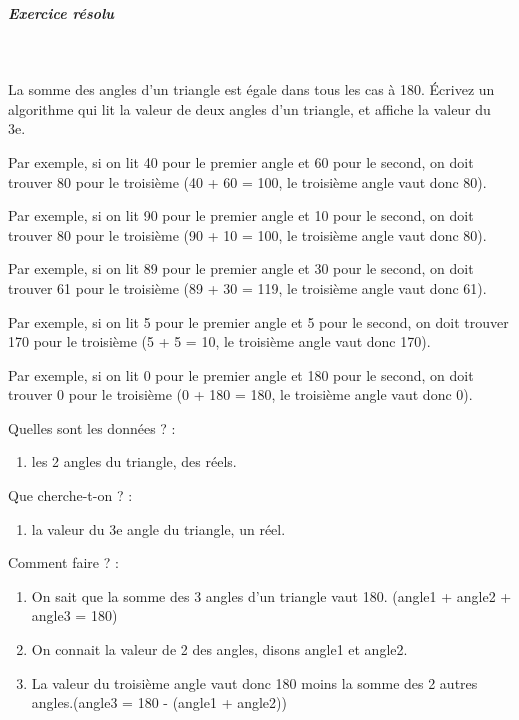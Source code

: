 \documentclass[11pt,a4paper]{article}
\begin{document}
			
		\subparagraph{Exercice r\'esolu} 
		
					\textcolor{white}{.} \par
				
          La somme des angles d'un triangle est \'egale dans tous les cas \`a 180\textdegree . \'Ecrivez un algorithme qui lit la valeur de deux angles d'un triangle, et affiche la valeur du 3e. 
        
            \par
        Par exemple, si on lit 40 pour le premier angle et 60 pour le second, on doit trouver 80 pour le troisi\`eme (40 + 60 = 100, le troisi\`eme angle vaut donc 80).
            \par
        Par exemple, si on lit 90 pour le premier angle et 10 pour le second, on doit trouver 80 pour le troisi\`eme (90 + 10 = 100, le troisi\`eme angle vaut donc 80).
            \par
        Par exemple, si on lit 89 pour le premier angle et 30 pour le second, on doit trouver 61 pour le troisi\`eme (89 + 30 = 119, le troisi\`eme angle vaut donc 61).
            \par
        Par exemple, si on lit 5 pour le premier angle et 5 pour le second, on doit trouver 170 pour le troisi\`eme (5 + 5 = 10, le troisi\`eme angle vaut donc 170).
            \par
        Par exemple, si on lit 0 pour le premier angle et 180 pour le second, on doit trouver 0 pour le troisi\`eme (0 + 180 = 180, le troisi\`eme angle vaut donc 0).
            \par
        
          Quelles sont les donn\'ees ? :
          
					\begin{enumerate}
				
			\item les 2 angles du triangle, des r\'eels.
					\end{enumerate}
				
          Que cherche-t-on ? :
          
					\begin{enumerate}
				
			\item la valeur du 3e angle du triangle, un r\'eel.
					\end{enumerate}
				
          Comment faire ? :
          
					\begin{enumerate}
				
			\item On sait que la somme des 3 angles d'un triangle vaut 180\textdegree . (angle1 + angle2 + angle3 = 180)
			\item On connait la valeur de 2 des angles, disons angle1 et angle2.
			\item La valeur du troisi\`eme angle vaut donc 180 moins la somme des 2 autres angles.(angle3 = 180 - (angle1 + angle2))
					\end{enumerate}
				
\end{document}
